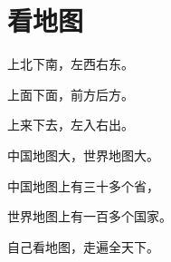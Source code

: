 \documentclass[12pt,UTF-8,openany]{ctexbook}
\begin{document}
\clearpage

\begin{center}
    
\end{center}


\hanzibox{}\hanzibox{}\hanzibox{}\hanzibox{}\hspace{1em}\hanzibox{}\hanzibox{}\hanzibox{}\hanzibox{}

\hanzibox{}\hanzibox{}\hanzibox{}\hanzibox{}\hspace{1em}\hanzibox{}\hanzibox{}\hanzibox{}\hanzibox{}

\hanzibox{}\hanzibox{}\hanzibox{}\hanzibox{}\hspace{1em}\hanzibox{}\hanzibox{}\hanzibox{}\hanzibox{}

\hanzibox{}\hanzibox{}\hanzibox{}\hanzibox{}\hspace{1em}\hanzibox{}\hanzibox{}\hanzibox{}\hanzibox{}






\chapter{看地图}

\begin{large}
    
    上北下南，左西右东。
    
    上面下面，前方后方。
    
    上来下去，左入右出。
    
    中国地图大，世界地图大。
    
    中国地图上有三十多个省，
    
    世界地图上有一百多个国家。
    
    自己看地图，走遍全天下。
    
\end{large}


\clearpage

\begin{center}
    
    
    
\end{center}
\end{document}
